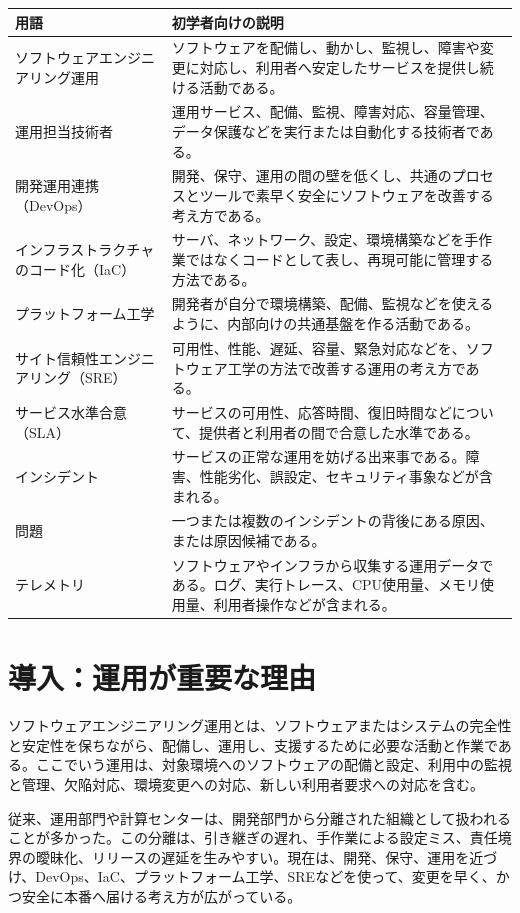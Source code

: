 \documentclass[uplatex,dvipdfmx,a4paper,10pt]{jsarticle}
\begin{document}
\begin{longtable}{L{35mm}L{115mm}}
\toprule
用語 & 初学者向けの説明 \\
\midrule
ソフトウェアエンジニアリング運用 & ソフトウェアを配備し、動かし、監視し、障害や変更に対応し、利用者へ安定したサービスを提供し続ける活動である。 \\
運用担当技術者 & 運用サービス、配備、監視、障害対応、容量管理、データ保護などを実行または自動化する技術者である。 \\
開発運用連携（DevOps） & 開発、保守、運用の間の壁を低くし、共通のプロセスとツールで素早く安全にソフトウェアを改善する考え方である。 \\
インフラストラクチャのコード化（IaC） & サーバ、ネットワーク、設定、環境構築などを手作業ではなくコードとして表し、再現可能に管理する方法である。 \\
プラットフォーム工学 & 開発者が自分で環境構築、配備、監視などを使えるように、内部向けの共通基盤を作る活動である。 \\
サイト信頼性エンジニアリング（SRE） & 可用性、性能、遅延、容量、緊急対応などを、ソフトウェア工学の方法で改善する運用の考え方である。 \\
サービス水準合意（SLA） & サービスの可用性、応答時間、復旧時間などについて、提供者と利用者の間で合意した水準である。 \\
インシデント & サービスの正常な運用を妨げる出来事である。障害、性能劣化、誤設定、セキュリティ事象などが含まれる。 \\
問題 & 一つまたは複数のインシデントの背後にある原因、または原因候補である。 \\
テレメトリ & ソフトウェアやインフラから収集する運用データである。ログ、実行トレース、CPU使用量、メモリ使用量、利用者操作などが含まれる。 \\
\bottomrule
\end{longtable}

\section*{導入：運用が重要な理由}

ソフトウェアエンジニアリング運用とは、ソフトウェアまたはシステムの完全性と安定性を保ちながら、配備し、運用し、支援するために必要な活動と作業である。ここでいう運用は、対象環境へのソフトウェアの配備と設定、利用中の監視と管理、欠陥対応、環境変更への対応、新しい利用者要求への対応を含む。

従来、運用部門や計算センターは、開発部門から分離された組織として扱われることが多かった。この分離は、引き継ぎの遅れ、手作業による設定ミス、責任境界の曖昧化、リリースの遅延を生みやすい。現在は、開発、保守、運用を近づけ、DevOps、IaC、プラットフォーム工学、SREなどを使って、変更を早く、かつ安全に本番へ届ける考え方が広がっている。
\end{document}

